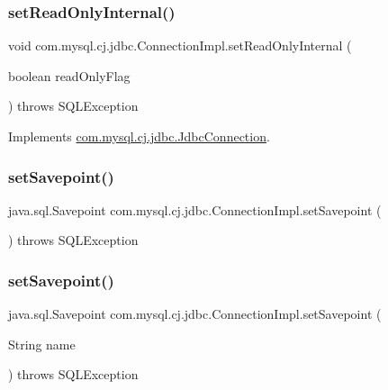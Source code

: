 \subsubsection{\texorpdfstring{set\+Read\+Only\+Internal()}{setReadOnlyInternal()}}
{\footnotesize\ttfamily void com.\+mysql.\+cj.\+jdbc.\+Connection\+Impl.\+set\+Read\+Only\+Internal (\begin{DoxyParamCaption}\item[{boolean}]{read\+Only\+Flag }\end{DoxyParamCaption}) throws S\+Q\+L\+Exception}



Implements \mbox{\hyperlink{interfacecom_1_1mysql_1_1cj_1_1jdbc_1_1_jdbc_connection_ad105c1e8c2184531cc209ce25e7817b3}{com.\+mysql.\+cj.\+jdbc.\+Jdbc\+Connection}}.

\mbox{\label{classcom_1_1mysql_1_1cj_1_1jdbc_1_1_connection_impl_af555ecffd63824b2d0ffd566f6aab7cc}} 
\subsubsection{\texorpdfstring{set\+Savepoint()}{setSavepoint()}\hspace{0.1cm}{\footnotesize\ttfamily [1/2]}}
{\footnotesize\ttfamily java.\+sql.\+Savepoint com.\+mysql.\+cj.\+jdbc.\+Connection\+Impl.\+set\+Savepoint (\begin{DoxyParamCaption}{ }\end{DoxyParamCaption}) throws S\+Q\+L\+Exception}

\mbox{\label{classcom_1_1mysql_1_1cj_1_1jdbc_1_1_connection_impl_ad50f77c6baf0a478c35d52ba98e76e84}} 
\subsubsection{\texorpdfstring{set\+Savepoint()}{setSavepoint()}\hspace{0.1cm}{\footnotesize\ttfamily [2/2]}}
{\footnotesize\ttfamily java.\+sql.\+Savepoint com.\+mysql.\+cj.\+jdbc.\+Connection\+Impl.\+set\+Savepoint (\begin{DoxyParamCaption}\item[{String}]{name }\end{DoxyParamCaption}) throws S\+Q\+L\+Exception}

